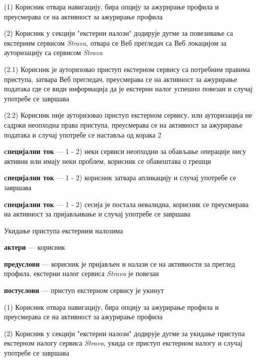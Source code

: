 \documentclass[12pt,oneside]{memoir}
\begin{document}
\begin{itemize}
\begin{description}
            \item (1) Корисник отвара навигацију, бира опцију за ажурирање профила и преусмерава се на активност за ажурирање профила
            \item (2) Корисник у секцији "екстерни налози" додирује дугме за повезивање са екстерним сервисом \textit{Strava}, отвара се Веб прегледач са Веб локацијом за ауторизацију са сервисом \textit{Strava}
            \begin{description}
                \item (2.1) Корисник је ауторизовао приступ екстерном сервису са потребним правима приступа, затвара Веб прегледач, преусмерава се на активност за ажурирање података где се види информација да је екстерни налог успешно повезан и случај употребе се завршава
                \item (2.2) Корисник није ауторизовао приступ екстерном сервису, или ауторизација не садржи неопходна права приступа, преусмерава се на активност за ажурирање података и случај употребе се наставља од корака 2
            \end{description}
            \item \textbf{cпецијални ток} --- 1 - 2) неки сервиси неопходни за обављање операције нису активни или имају неки проблем, корисник се обавештава о грешци
            \item \textbf{cпецијални ток} --- 1 - 2) корисник затвара апликацију и случај употребе се завршава
            \item \textbf{cпецијални ток} --- 1 - 2) сесија је постала невалидна, корисник се преусмерава на активност за пријављивање и случај употребе се завршава
        \end{description}
    \item Укидање приступа екстерним налозима
        \begin{description}
            \item \textbf{актери} --- корисник
            \item \textbf{предуслови} --- корисник је пријављен и налази се на активности за преглед профила, екстерни налог сервиса \textit{Strava} је повезан
            \item \textbf{постуслови} --- приступ екстерном сервису је укинут
            \item (1) Корисник отвара навигацију, бира опцију за ажурирање профила и преусмерава се на активност за ажурирање профила
            \item (2) Корисник у секцији "екстерни налози" додирује дугме за укидање приступа екстерном налогу сервиса \textit{Strava}, укида се приступ екстерном налогу и случај употребе се завршава

\end{description}
\end{itemize}
\end{document}
